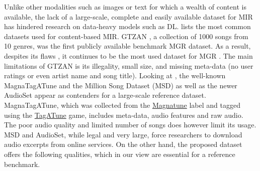 \documentclass{article}
\begin{document}


Unlike other modalities such as images or text for which a wealth of content is available, the lack of a large-scale, complete and easily available dataset for MIR has hindered research on data-heavy models such as DL.
 lists the most common datasets used for content-based MIR.
GTZAN \cite{gtzan}, a collection of 1000 songs from 10 genres, was the first publicly available benchmark MGR dataset. As a result, despites its flaws \cite{gtzan_critic_1}, it continues to be the most used dataset for MGR \cite{mgr_eval}. The main limitations of GTZAN is its illegality, small size, and missing meta-data (no user ratings or even artist name and song title). %
Looking at , the well-known MagnaTagATune and the Million Song Dataset (MSD) as well as the newer AudioSet appear as contenders for a large-scale reference dataset. %
MagnaTagATune, which was collected from the \href{https://magnatune.com/}{Magnatune} label and tagged using the \href{http://tagatune.org/}{TagATune} game, includes meta-data, audio features and raw audio. The poor audio quality and limited number of songs does however limit its usage.
MSD and AudioSet, while legal and very large, force researchers to download audio excerpts from online services.
On the other hand, the proposed dataset offers the following qualities, which in our view are essential for a reference benchmark.
\end{document}
